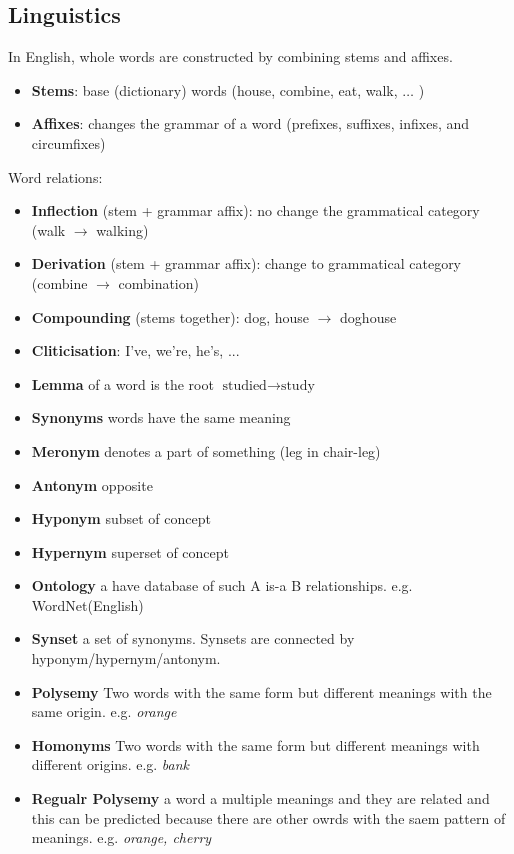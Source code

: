 \documentclass[8pt]{extarticle} %
\begin{document}
\begin{multicols*}{3}
\subsection*{Linguistics}
In English, whole words are constructed by combining stems and affixes.
\begin{itemize}[label=\textbullet, labelsep=0.3em, leftmargin=0.5em, itemsep=0em]
\item \textbf{Stems}: base (dictionary) words (house, combine, eat, walk, $\ldots$ )
\item \textbf{Affixes}: changes the grammar of a word (prefixes, suffixes, infixes, and circumfixes)
\end{itemize}
Word relations:
\begin{itemize}[label=-, labelsep=0.3em, leftmargin=0.5em, itemsep=0em]
    \item \textbf{Inflection} (stem + grammar affix): no change the grammatical category (walk $\rightarrow$ walking)
    \item \textbf{Derivation} (stem + grammar affix): change to grammatical category (combine $\rightarrow$ combination)
    \item \textbf{Compounding} (stems together): dog, house $\rightarrow$ doghouse
    \item \textbf{Cliticisation}: I've, we're, he's, ...
    \item \textbf{Lemma} of a word is the root $\text{studied}\rightarrow \text{study}$\\
    \item \textbf{Synonyms} words have the same meaning 
    \item \textbf{Meronym} denotes a part of something (leg in chair-leg)
    \item \textbf{Antonym} opposite
    \item \textbf{Hyponym} subset of concept
    \item \textbf{Hypernym} superset of concept 
    \item \textbf{Ontology} a have database of such A is-a B relationships. e.g. WordNet(English)
    \item \textbf{Synset} a set of synonyms. Synsets are connected by hyponym/hypernym/antonym. 
    \item \textbf{Polysemy} Two words with the same form but different meanings with the same origin. e.g. \textit{orange}
    \item \textbf{Homonyms} Two words with the same form but different meanings with different origins. e.g. \textit{bank}
    \item \textbf{Regualr Polysemy} a word a multiple meanings and they are related and this can be predicted because there are other owrds with the saem pattern of meanings. e.g. \textit{orange, cherry}

\end{itemize}
\end{multicols*}
\end{document}
